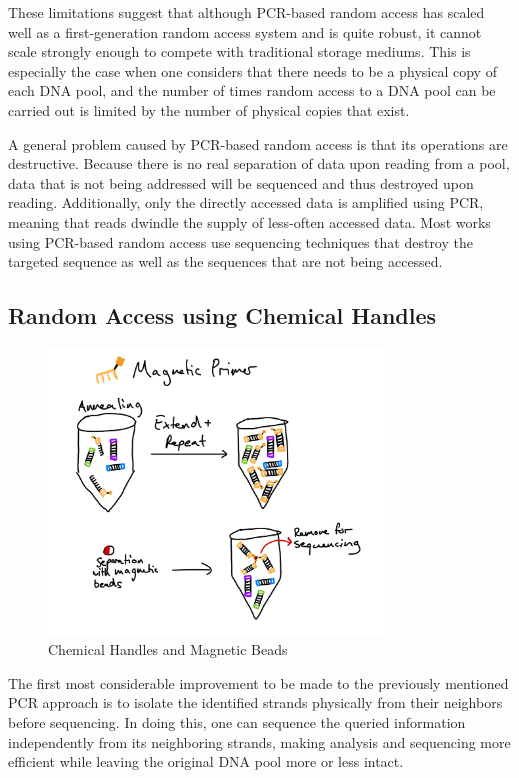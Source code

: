 \documentclass[a4paper,conference]{IEEEtran}
\begin{document}
These limitations suggest that although PCR-based random access has scaled well as a first-generation random access system and is quite robust, it cannot scale strongly enough to compete with traditional storage mediums. This is especially the case when one considers that there needs to be a physical copy of each DNA pool, and the number of times random access to a DNA pool can be carried out is limited by the number of physical copies that exist.

A general problem caused by PCR-based random access is that its operations are destructive. Because there is no real separation of data upon reading from a pool, data that is not being addressed will be sequenced and thus destroyed upon reading. Additionally, only the directly accessed data is amplified using PCR, meaning that reads dwindle the supply of less-often accessed data. Most works using PCR-based random access use sequencing techniques that destroy the targeted sequence as well as the sequences that are not being accessed.

\subsection{Random Access using Chemical Handles}

\begin{figure}[!t]
\centering
\includegraphics[width=3.5in]{chemicalHandlesRA}
\caption{Chemical Handles and Magnetic Beads}
\label{pcr_challenges}
\end{figure}

The first most considerable improvement to be made to the previously mentioned PCR approach is to isolate the identified strands physically from their neighbors before sequencing. In doing this, one can sequence the queried information independently from its neighboring strands, making analysis and sequencing more efficient while leaving the original DNA pool more or less intact.
\end{document}
